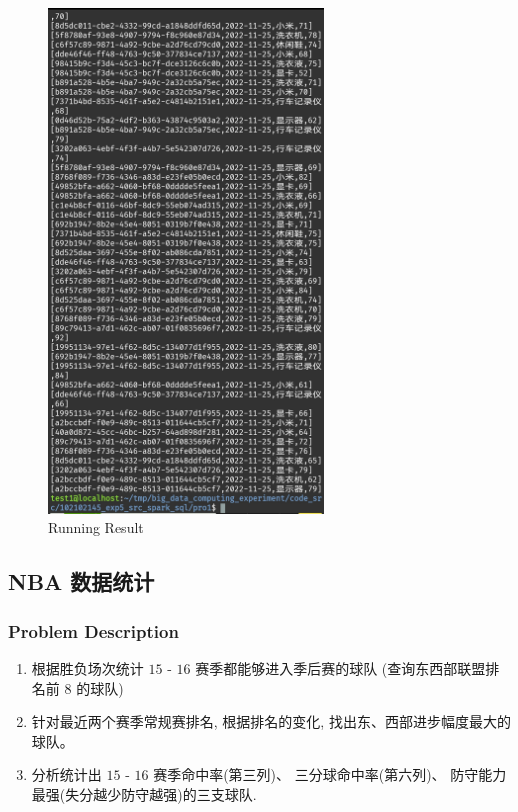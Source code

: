 \documentclass{article}
\begin{document}
\begin{figure}[H]
  \begin{center}
    \includegraphics[width=0.65\textwidth]{./figures/3.jpg}
  \end{center}
  \caption{Running Result}
\end{figure}

\subsection{NBA 数据统计}
\subsubsection{Problem Description}
\begin{enumerate}
  \item 根据胜负场次统计 $ 15 $ - $ 16 $ 赛季都能够进入季后赛的球队
    (查询东西部联盟排名前 $ 8 $ 的球队)
  \item 针对最近两个赛季常规赛排名, 根据排名的变化, 找出东、西部进步幅度最大的球队。
  \item 分析统计出 $ 15 $ - $ 16 $ 赛季命中率(第三列)、 三分球命中率(第六列)、
    防守能力最强(失分越少防守越强)的三支球队.
\end{enumerate}
\end{document}
